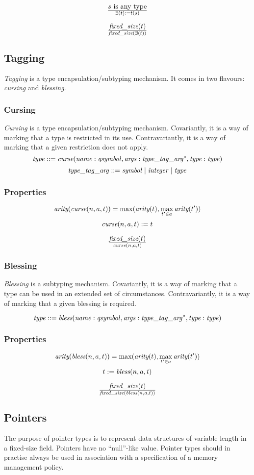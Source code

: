 \documentclass[a4paper]{report}
\newcommand\arity{{\ensuremath\textit{arity}}}
\newcommand\fixedsize{{\ensuremath\textit{fixed\_size}}}
\newcommand\tyBless{{\ensuremath\textit{bless}}}
\newcommand\tyCurse{{\ensuremath\textit{curse}}}
\begin{document}
$${s \textrm{ is any type}} \over \exists(t) := t(s)$$

$$\fixedsize(t) \over \fixedsize(\exists(t))$$

\subsection{Tagging}
\emph{Tagging} is a type encapsulation/subtyping mechanism.
It comes in two flavours: \emph{cursing} and \emph{blessing}.

\subsubsection{Cursing}
\emph{Cursing} is a type encapsulation/subtyping mechanism.
Covariantly, it is a way of marking that a type is restricted in its use.
Contravariantly, it is a way of marking that a given restriction does not apply.
$$
\it type ::= \tyCurse(name : qsymbol, args : type\_tag\_arg^*, type : type)
$$
$$
\it type\_tag\_arg ::= symbol \;|\; integer \;|\; type
$$

\subsubsection*{Properties}
$$
\arity(\tyCurse(n,a,t)) = \max(\arity(t), \max_{t' \in a} \arity(t'))
$$
$$
\tyCurse(n,a,t) := t
$$

$$\fixedsize(t) \over \tyCurse(n,a,t)$$

\subsubsection{Blessing}
\emph{Blessing} is a subtyping mechanism.
Covariantly, it is a way of marking that a type can be used in an
extended set of circumstances.
Contravariantly, it is a way of marking that a given blessing is required.

$$
\it type ::= \tyBless(name : qsymbol, args : type\_tag\_arg^*, type : type)
$$

\subsubsection*{Properties}
$$
\arity(\tyBless(n,a,t)) = \max(\arity(t), \max_{t' \in a} \arity(t'))
$$
$$
t := \tyBless(n,a,t)
$$

$$\fixedsize(t) \over \fixedsize(\tyBless(n,a,t))$$

\subsection{Pointers}
The purpose of pointer types is to represent data structures of variable length
in a fixed-size field.
Pointers have no ``null''-like value. Pointer types should in practise
always be used in association with a specification of a memory management
policy.
\end{document}
